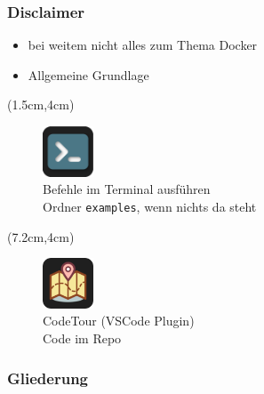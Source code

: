 \documentclass[22pt]{beamer}
\newcommand{\code}[1]{\colorbox{darkgray!20}{\texttt{#1}}}
\begin{document}
\begin{frame}[t]
    \frametitle{Disclaimer}
    \begin{itemize}
        \item bei weitem nicht alles zum Thema Docker
        \item Allgemeine Grundlage
    \end{itemize}

    \begin{textblock*}{4.5cm}(1.5cm,4cm) %
        \begin{figure}
            \includegraphics[width=1.5cm]{Bilder/terminal2.png}
            \captionsetup{justification=centering}
            \caption*{Befehle im Terminal ausführen\\ Ordner \code{examples}, wenn nichts da steht}
        \end{figure}

    \end{textblock*}

    \begin{textblock*}{4.5cm}(7.2cm,4cm) %
        \begin{figure}
            \includegraphics[width=1.5cm]{Bilder/CodeTour.png}
            \centering
            \captionsetup{justification=centering}
            \caption*{CodeTour (VSCode Plugin)\\Code im Repo}
        \end{figure}
    \end{textblock*}

\end{frame}

\begin{frame}[plain]
    \frametitle{Gliederung}
    \tableofcontents
\end{frame}
\end{document}

